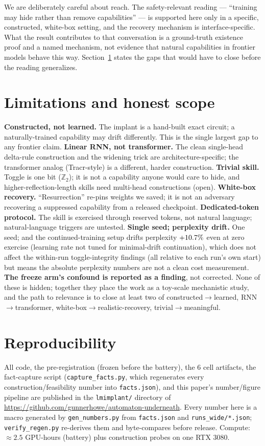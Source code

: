 \documentclass[10pt]{article}
\begin{document}
We are deliberately careful about reach. The safety-relevant reading --- ``training may hide rather
than remove capabilities'' --- is supported here only in a specific, constructed, white-box setting,
and the recovery mechanism is interface-specific. What the result contributes to that conversation is
a ground-truth existence proof and a named mechanism, not evidence that natural capabilities in
frontier models behave this way. Section~\ref{sec:limits} states the gaps that would have to close
before the reading generalizes.

\section{Limitations and honest scope}\label{sec:limits}
\textbf{Constructed, not learned.} The implant is a hand-built exact circuit; a naturally-trained
capability may drift differently. This is the single largest gap to any frontier claim.
\textbf{Linear RNN, not transformer.} The clean single-head delta-rule construction and the widening
trick are architecture-specific; the transformer analog (Tracr-style) is a different, harder
construction. \textbf{Trivial skill.} Toggle is one bit ($\mathbb{Z}_2$); it is not a capability
anyone would care to hide, and higher-reflection-length skills need multi-head constructions (open).
\textbf{White-box recovery.} ``Resurrection'' re-pins weights we saved; it is not an adversary
recovering a suppressed capability from a released checkpoint. \textbf{Dedicated-token protocol.} The
skill is exercised through reserved tokens, not natural language; natural-language triggers are
untested. \textbf{Single seed; perplexity drift.} One seed; and the continued-training setup drifts
perplexity $+10.7\%$ even at zero exercise (learning rate not tuned for minimal-drift
continuation), which does not affect the within-run toggle-integrity findings (all relative to each
run's own start) but means the absolute perplexity numbers are not a clean cost measurement.
\textbf{The freeze arm's confound is reported as a finding}, not corrected. None of these is hidden;
together they place the work as a toy-scale mechanistic study, and the path to relevance is to close
at least two of {constructed$\to$learned, RNN$\to$transformer, white-box$\to$realistic-recovery,
trivial$\to$meaningful}.

\section{Reproducibility}\label{sec:repro}
All code, the pre-registration (frozen before the battery), the $6$ cell artifacts, the fact-capture
script (\texttt{capture\_facts.py}, which regenerates every construction/feasibility number into
\texttt{facts.json}), and this paper's number/figure pipeline are published in the \texttt{lmimplant/}
directory of \url{https://github.com/gunnerhowe/automaton-underneath}. Every number here is a macro
generated by \texttt{gen\_numbers.py} from \texttt{facts.json} and \texttt{runs\_wide/*.json};
\texttt{verify\_regen.py} re-derives them and byte-compares before release. Compute:
$\approx2.5$ GPU-hours (battery) plus construction probes on one RTX 3080.



\end{document}
